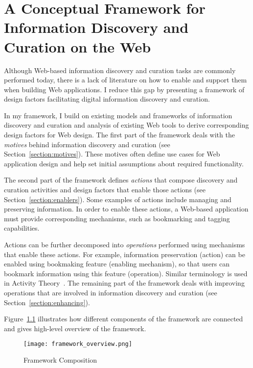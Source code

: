 \chapter{A Conceptual Framework for Information Discovery and Curation on the Web}
\label{chapter:framework}

Although Web-based information discovery and curation tasks are commonly performed today, there is a lack of literature on how to enable and support them when building Web applications. I reduce this gap by presenting a framework of design factors facilitating digital information discovery and curation. 

In my framework, I build on existing models and frameworks of information discovery and curation and analysis of existing Web tools to derive corresponding design factors for Web design. The first part of the framework deals with the \textit{motives} behind information discovery and curation (see Section~\ref{section:motives}). These motives often define use cases for Web application design and help set initial assumptions about required functionality.

The second part of the framework defines \textit{actions} that compose discovery and curation activities and design factors that enable those actions (see Section~\ref{section:enablers}). Some examples of actions include managing and preserving information. In order to enable these actions, a Web-based application must provide corresponding mechanisms, such as bookmarking and tagging capabilities.

Actions can be further decomposed into \textit{operations} performed using mechanisms that enable these actions. For example, information preservation (action) can be enabled using bookmaking feature (enabling mechanism), so that users can bookmark information using this feature (operation). Similar terminology is used in Activity Theory~\cite{kuutti1996activity}. The remaining part of the framework deals with improving operations that are involved in information discovery and curation (see Section~\ref{section:enhancing}).  

Figure~\ref{fig:framework_overview} illustrates how different components of the framework are connected and gives high-level overview of the framework. 

\begin{figure}[ht!]
	\noindent
	\centering
	\texttt{[image: framework\_overview.png]}
	\caption{Framework Composition}
	\label{fig:framework_overview} 
\end{figure}
\clearpage

